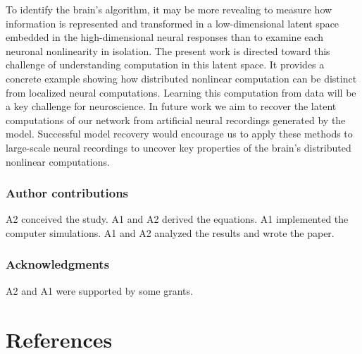 \documentclass{article}
\begin{document}
To identify the brain's algorithm, it may be more revealing to measure how information is represented and transformed in a low-dimensional latent space embedded in the high-dimensional neural responses than to examine each neuronal nonlinearity in isolation. The present work is directed toward this challenge of understanding computation in this latent space. It provides a concrete example showing how distributed nonlinear computation can be distinct from localized neural computations. Learning this computation from data will be a key challenge for neuroscience. In future work we aim to recover the latent computations of our network from artificial neural recordings generated by the model. Successful model recovery would encourage us to apply these methods to large-scale neural recordings to uncover key properties of the brain's distributed nonlinear computations.


 
\newcommand{\RR}{A1 }		%
\newcommand{\XP}{A2 }

\subsubsection*{Author contributions} \XP conceived the study. \RR and \XP derived the equations. \RR implemented the computer simulations. \RR and \XP analyzed the results and wrote the paper.


\subsubsection*{Acknowledgments}

\XP and \RR were supported by some grants. %



\section*{References}
\small
\label{sec:references}

{\def\section*#1{}

}
\end{document}
